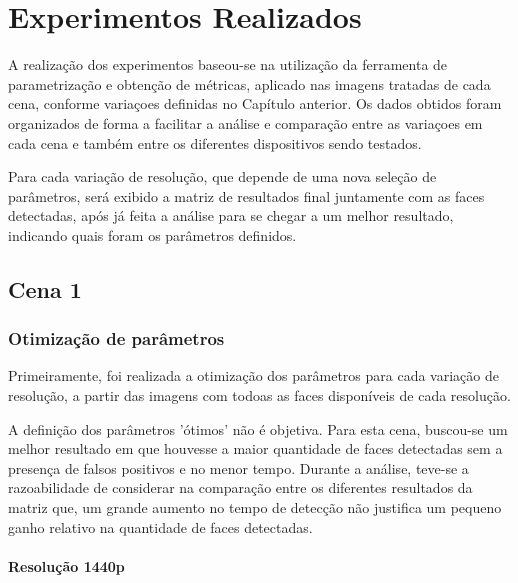\chapter{Experimentos Realizados}
\thispagestyle{plain}
\label{cap:experimentos}
\graphicspath{{./Cap4_Experimentos_Realizados/Figures/}}

A realização dos experimentos baseou-se na utilização da ferramenta de parametrização e obtenção de métricas, aplicado nas imagens tratadas de cada cena, conforme variaçoes definidas no Capítulo anterior. Os dados obtidos foram organizados de forma a facilitar a análise e comparação entre as variaçoes em cada cena e também entre os diferentes dispositivos sendo testados.

Para cada variação de resolução, que depende de uma nova seleção de parâmetros, será exibido a matriz de resultados final juntamente com as faces detectadas, após já feita a análise para se chegar a um melhor resultado, indicando quais foram os parâmetros definidos.

\section{Cena 1}

\subsection{Otimização de parâmetros}

Primeiramente, foi realizada a otimização dos parâmetros para cada variação de resolução, a partir das imagens com todoas as faces disponíveis de cada resolução.

A definição dos parâmetros 'ótimos' não é objetiva. Para esta cena, buscou-se um melhor resultado em que houvesse a maior quantidade de faces detectadas sem a presença de falsos positivos e no menor tempo. Durante a análise, teve-se a razoabilidade de considerar na comparação entre os diferentes resultados da matriz que, um grande aumento no tempo de detecção não justifica um pequeno ganho relativo na quantidade de faces detectadas.

\subsubsection{Resolução 1440p}

